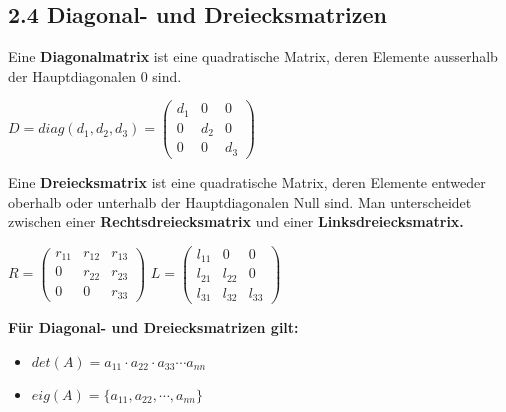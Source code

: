 \subsection{2.4 Diagonal- und Dreiecksmatrizen}{

\vskip1pt

Eine \textbf{Diagonalmatrix} ist eine quadratische Matrix, deren Elemente ausserhalb der Hauptdiagonalen 0 sind.

\begin{center}

$ D = diag(d_1, d_2, d_3) = \begin{pmatrix} d_1 & 0 & 0 \\ 0 & d_2 & 0 \\ 0 & 0 & d_3 \end{pmatrix}$

\end{center}

Eine \textbf{Dreiecksmatrix} ist eine quadratische Matrix, deren Elemente entweder oberhalb oder unterhalb der Hauptdiagonalen Null sind. Man unterscheidet zwischen einer \textbf{Rechtsdreiecksmatrix} und einer \textbf{Linksdreiecksmatrix.}

\begin{center}

$ R = \begin{pmatrix} r_{11} & r_{12} & r_{13} \\ 0 & r_{22} & r_{23} \\ 0 & 0 & r_{33} \end{pmatrix}$
\hskip10pt
$ L = \begin{pmatrix} l_{11} & 0 & 0 \\ l_{21} & l_{22} & 0 \\ l_{31} & l_{32} & l_{33} \end{pmatrix}$

\end{center}

\textbf{Für Diagonal- und Dreiecksmatrizen gilt:} \par
\begin{itemize}[leftmargin=0.29cm, itemsep=0.8pt]
\item $det(A) = a_{11} \cdot a_{22} \cdot a_{33}   \dotsm a_{nn}$
\item $eig(A) = \{a_{11}, a_{22}, \cdots ,  a_{nn}\}$
\end{itemize}

}